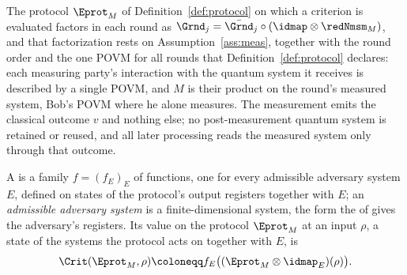 
The protocol $\Eprot_M$ of Definition~\ref{def:protocol} on which a criterion
is evaluated factors in each round as
$\Grnd_j=\bar{\Grnd}_j\circ(\idmap\otimes\redNmsm_M)$, and that factorization
rests on Assumption~\ref{ass:meas}, together with the round order and the one
POVM for all rounds that Definition~\ref{def:protocol} declares: each
measuring party's interaction with the quantum system it receives is
described by a single POVM, and $M$ is their product on the round's measured
system, Bob's POVM where he alone measures. The measurement emits the
classical outcome $v$ and nothing else; no post-measurement quantum system is
retained or reused, and all later processing reads the measured system only
through that outcome.

\begin{definition}\label{def:criterion}
A
is a family $f=(f_E)_E$ of functions, one for every admissible adversary
system $E$, defined on states of the protocol's output registers together with
$E$; an \emph{admissible adversary system} is a finite-dimensional system,
the form the  of  gives
the adversary's registers. Its value
on the protocol $\Eprot_M$ at an input $\rho$, a state of the systems the
protocol acts on together with $E$, is
\begin{equation}\label{eq:criterion}
  \Crit(\Eprot_M,\rho)\coloneqq
  f_E\big((\Eprot_M\otimes\idmap_E)(\rho)\big).
\end{equation}
\end{definition}
